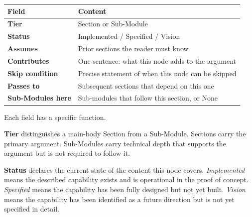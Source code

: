 \documentclass[
  11pt,
  a4paper,
  twoside,
  openright]{scrbook}
\newcounter{none} %
\begin{document}
\begin{tcolorbox}[enhanced jigsaw, arc=.35mm, bottomrule=.15mm, bottomtitle=1mm, breakable, colback=white, colbacktitle=quarto-callout-note-color!10!white, colframe=quarto-callout-note-color-frame, coltitle=black, left=2mm, leftrule=.75mm, opacityback=0, opacitybacktitle=0.6, rightrule=.15mm, title={Node Declaration --- §X.X Section Title}, titlerule=0mm, toprule=.15mm, toptitle=1mm]

{\def\LTcaptype{none} %
\begin{longtable}[]{@{}
  >{\raggedright\arraybackslash}p{}
  >{\raggedright\arraybackslash}p{}@{}}
\toprule\noalign{}
\begin{minipage}[b]{\linewidth}\raggedright
Field
\end{minipage} & \begin{minipage}[b]{\linewidth}\raggedright
Content
\end{minipage} \\
\midrule\noalign{}
\endhead
\bottomrule\noalign{}
\endlastfoot
\textbf{Tier} & Section or Sub-Module \\
\textbf{Status} & Implemented / Specified / Vision \\
\textbf{Assumes} & Prior sections the reader must know \\
\textbf{Contributes} & One sentence: what this node adds to the
argument \\
\textbf{Skip condition} & Precise statement of when this node can be
skipped \\
\textbf{Passes to} & Subsequent sections that depend on this one \\
\textbf{Sub-Modules here} & Sub-modules that follow this section, or
None \\
\end{longtable}
}

\end{tcolorbox}

Each field has a specific function.

\textbf{Tier} distinguishes a main-body Section from a Sub-Module.
Sections carry the primary argument. Sub-Modules carry technical depth
that supports the argument but is not required to follow it.

\textbf{Status} declares the current state of the content this node
covers. \emph{Implemented} means the described capability exists and is
operational in the proof of concept. \emph{Specified} means the
capability has been fully designed but not yet built. \emph{Vision}
means the capability has been identified as a future direction but is
not yet specified in detail.
\end{document}
